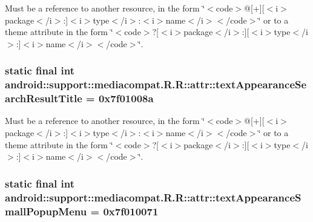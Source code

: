 Must be a reference to another resource, in the form \char`\"{}$<$code$>$@\mbox{[}+\mbox{]}\mbox{[}$<$i$>$package$<$/i$>$:\mbox{]}$<$i$>$type$<$/i$>$:$<$i$>$name$<$/i$>$$<$/code$>$\char`\"{} or to a theme attribute in the form \char`\"{}$<$code$>$?\mbox{[}$<$i$>$package$<$/i$>$:\mbox{]}\mbox{[}$<$i$>$type$<$/i$>$:\mbox{]}$<$i$>$name$<$/i$>$$<$/code$>$\char`\"{}. \hypertarget{classandroid_1_1support_1_1mediacompat_1_1_r_1_1attr_811b01d7d318376669456217e81ba1d6}{
\subsubsection[{textAppearanceSearchResultTitle}]{\setlength{\rightskip}{0pt plus 5cm}static final int android::support::mediacompat.R.R::attr::textAppearanceSearchResultTitle = 0x7f01008a}}
\label{classandroid_1_1support_1_1mediacompat_1_1_r_1_1attr_811b01d7d318376669456217e81ba1d6}


Must be a reference to another resource, in the form \char`\"{}$<$code$>$@\mbox{[}+\mbox{]}\mbox{[}$<$i$>$package$<$/i$>$:\mbox{]}$<$i$>$type$<$/i$>$:$<$i$>$name$<$/i$>$$<$/code$>$\char`\"{} or to a theme attribute in the form \char`\"{}$<$code$>$?\mbox{[}$<$i$>$package$<$/i$>$:\mbox{]}\mbox{[}$<$i$>$type$<$/i$>$:\mbox{]}$<$i$>$name$<$/i$>$$<$/code$>$\char`\"{}. \hypertarget{classandroid_1_1support_1_1mediacompat_1_1_r_1_1attr_eece67acae176545c5205ea3a79987b8}{
\subsubsection[{textAppearanceSmallPopupMenu}]{\setlength{\rightskip}{0pt plus 5cm}static final int android::support::mediacompat.R.R::attr::textAppearanceSmallPopupMenu = 0x7f010071}}
\label{classandroid_1_1support_1_1mediacompat_1_1_r_1_1attr_eece67acae176545c5205ea3a79987b8}


